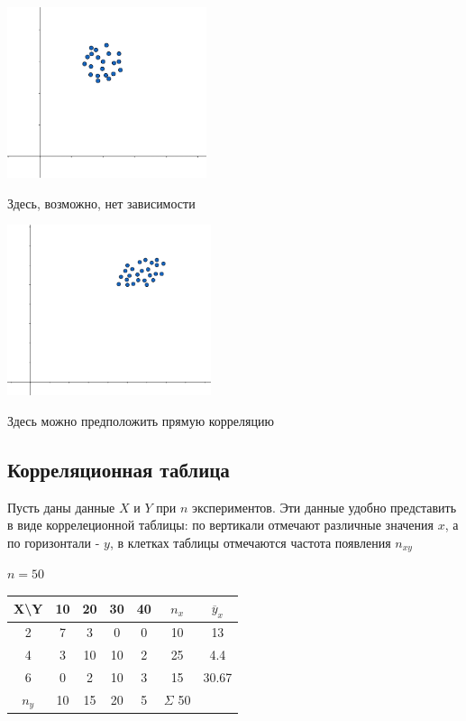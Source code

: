 \documentclass[12pt]{article}
\begin{document}

\Ex 

\begin{multicols}{2}
    \begin{center}
        \includegraphics[height=5cm]{mathstat/images/mathstat_2025_04_01_1}

        Здесь, возможно, нет зависимости

        \includegraphics[height=5cm]{mathstat/images/mathstat_2025_04_01_2}

        Здесь можно предположить прямую корреляцию
    \end{center}
\end{multicols}

\subsection{Корреляционная таблица}

Пусть даны данные $X$ и $Y$ при $n$ экспериментов. Эти данные удобно представить в виде коррелеционной таблицы:
по вертикали отмечают различные значения $x$, а по горизонтали - $y$, в клетках таблицы отмечаются частота появления $n_{xy}$

\Ex $n = 50$

\smallvspace

\begin{tabular}{c|c|c|c|c|c|c}
    X\backslash Y & 10 & 20 & 30 & 40 & $n_x$ & $\overline y_x$ \\
    \hline
    2 & 7 & 3 & 0 & 0 & 10 & 13 \\
    \hline
    4 & 3 & 10 & 10 & 2 & 25 & 4.4 \\
    \hline
    6 & 0 & 2 & 10 & 3 & 15 & 30.67 \\
    \hline
    $n_y$ & 10 & 15 & 20 & 5 & $\Sigma$ 50 & \\
\end{tabular}
\end{document}
